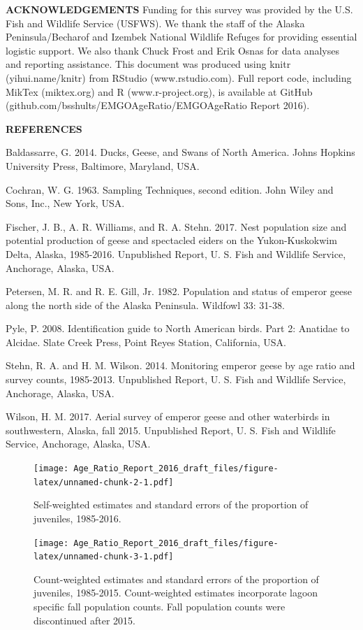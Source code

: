 \documentclass[]{article}
\begin{document}
\textbf{ACKNOWLEDGEMENTS}\newline
Funding for this survey was provided by the U.S. Fish and Wildlife
Service (USFWS). We thank the staff of the Alaska Peninsula/Becharof and
Izembek National Wildlife Refuges for providing essential logistic
support. We also thank Chuck Frost and Erik Osnas for data analyses and
reporting assistance. This document was produced using knitr
(yihui.name/knitr) from RStudio (www.rstudio.com). Full report code,
including MikTex (miktex.org) and R (www.r-project.org), is available at
GitHub (github.com/bsshults/EMGOAgeRatio/EMGOAgeRatio Report 2016).

\textbf{REFERENCES}

\setlength{\parindent}{-0.2in} \setlength{\leftskip}{0.2in}
\setlength{\parskip}{1ex}

Baldassarre, G. 2014. Ducks, Geese, and Swans of North America. Johns
Hopkins University Press, Baltimore, Maryland, USA.

Cochran, W. G. 1963. Sampling Techniques, second edition. John Wiley and
Sons, Inc., New York, USA.

Fischer, J. B., A. R. Williams, and R. A. Stehn. 2017. Nest population
size and potential production of geese and spectacled eiders on the
Yukon-Kuskokwim Delta, Alaska, 1985-2016. Unpublished Report, U. S. Fish
and Wildlife Service, Anchorage, Alaska, USA.

Petersen, M. R. and R. E. Gill, Jr. 1982. Population and status of
emperor geese along the north side of the Alaska Peninsula. Wildfowl 33:
31-38.

Pyle, P. 2008. Identification guide to North American birds. Part 2:
Anatidae to Alcidae. Slate Creek Press, Point Reyes Station, California,
USA.

Stehn, R. A. and H. M. Wilson. 2014. Monitoring emperor geese by age
ratio and survey counts, 1985-2013. Unpublished Report, U. S. Fish and
Wildlife Service, Anchorage, Alaska, USA.

Wilson, H. M. 2017. Aerial survey of emperor geese and other waterbirds
in southwestern, Alaska, fall 2015. Unpublished Report, U. S. Fish and
Wildlife Service, Anchorage, Alaska, USA.

\newpage
\begin{figure}[htbp]
\centering
\texttt{[image: Age\_Ratio\_Report\_2016\_draft\_files/figure-latex/unnamed-chunk-2-1.pdf]}
\caption{Self-weighted estimates and standard errors of the proportion of juveniles, 1985-2016.}
\end{figure}
\begin{figure}[htbp]
\centering
\texttt{[image: Age\_Ratio\_Report\_2016\_draft\_files/figure-latex/unnamed-chunk-3-1.pdf]}
\caption{Count-weighted estimates and standard errors of the proportion
	of juveniles, 1985-2015. Count-weighted estimates incorporate lagoon specific fall population counts. Fall population counts were discontinued after 2015.}
\end{figure}
 \newpage
\end{document}
